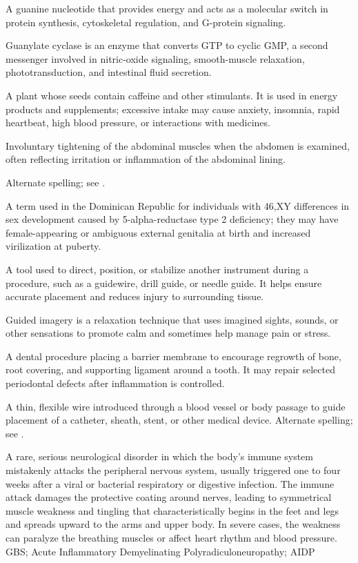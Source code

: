  A guanine nucleotide that provides energy and acts as a molecular switch in protein synthesis, cytoskeletal regulation, and G-protein signaling.

 Guanylate cyclase is an enzyme that converts GTP to cyclic GMP, a second messenger involved in nitric-oxide signaling, smooth-muscle relaxation, phototransduction, and intestinal fluid secretion.

 A plant whose seeds contain caffeine and other stimulants. It is used in energy products and supplements; excessive intake may cause anxiety, insomnia, rapid heartbeat, high blood pressure, or interactions with medicines.

 Involuntary tightening of the abdominal muscles when the abdomen is examined, often reflecting irritation or inflammation of the abdominal lining.

 Alternate spelling; see .

 A term used in the Dominican Republic for individuals with 46,XY differences in sex development caused by 5-alpha-reductase type 2 deficiency; they may have female-appearing or ambiguous external genitalia at birth and increased virilization at puberty.

 A tool used to direct, position, or stabilize another instrument during a procedure, such as a guidewire, drill guide, or needle guide. It helps ensure accurate placement and reduces injury to surrounding tissue.

 Guided imagery is a relaxation technique that uses imagined sights, sounds, or other sensations to promote calm and sometimes help manage pain or stress.

 A dental procedure placing a barrier membrane to encourage regrowth of bone, root covering, and supporting ligament around a tooth. It may repair selected periodontal defects after inflammation is controlled.

 A thin, flexible wire introduced through a blood vessel or body passage to guide placement of a catheter, sheath, stent, or other medical device.
 Alternate spelling; see .

 A rare, serious neurological disorder in which the body's immune system mistakenly attacks the peripheral nervous system, usually triggered one to four weeks after a viral or bacterial respiratory or digestive infection. The immune attack damages the protective coating around nerves, leading to symmetrical muscle weakness and tingling that characteristically begins in the feet and legs and spreads upward to the arms and upper body. In severe cases, the weakness can paralyze the breathing muscles or affect heart rhythm and blood pressure.
\synonyms
GBS; Acute Inflammatory Demyelinating Polyradiculoneuropathy; AIDP

